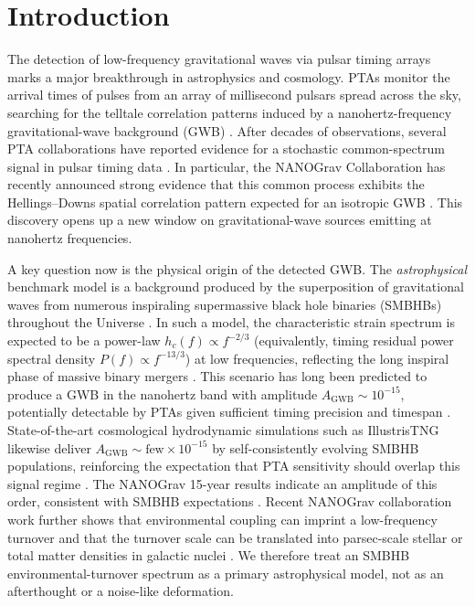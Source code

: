\documentclass[symmetry,article,submit,pdftex,moreauthors]{Definitions/mdpi}
\begin{document}
\section{Introduction}\label{sec:intro}
The detection of low-frequency gravitational waves via pulsar timing arrays marks a major breakthrough in astrophysics and cosmology. PTAs monitor the arrival times of pulses from an array of millisecond pulsars spread across the sky, searching for the telltale correlation patterns induced by a nanohertz-frequency gravitational-wave background (GWB) \cite{Hellings1983,BurkeSpolaor2019}. After decades of observations, several PTA collaborations have reported evidence for a stochastic common-spectrum signal in pulsar timing data \cite{NANOGrav12p5,Chen2021,Goncharov2021,PPTA2023,CPTA2023}. In particular, the NANOGrav Collaboration has recently announced strong evidence that this common process exhibits the Hellings--Downs spatial correlation pattern expected for an isotropic GWB \cite{NANOGrav15-Evidence}. This discovery opens up a new window on gravitational-wave sources emitting at nanohertz frequencies.

A key question now is the physical origin of the detected GWB. The \emph{astrophysical} benchmark model is a background produced by the superposition of gravitational waves from numerous inspiraling supermassive black hole binaries (SMBHBs) throughout the Universe \cite{Sesana2013,Kelley2017}. In such a model, the characteristic strain spectrum is expected to be a power-law $h_c(f) \propto f^{-2/3}$ (equivalently, timing residual power spectral density $P(f) \propto f^{-13/3}$) at low frequencies, reflecting the long inspiral phase of massive binary mergers \cite{Sesana2013}. This scenario has long been predicted to produce a GWB in the nanohertz band with amplitude $A_{\mathrm{GWB}}\sim10^{-15}$, potentially detectable by PTAs given sufficient timing precision and timespan \cite{Sesana2013}. State-of-the-art cosmological hydrodynamic simulations such as IllustrisTNG likewise deliver $A_{\mathrm{GWB}}\sim\text{few}\times10^{-15}$ by self-consistently evolving SMBHB populations, reinforcing the expectation that PTA sensitivity should overlap this signal regime \cite{Kelley2017}. The NANOGrav 15-year results indicate an amplitude of this order, consistent with SMBHB expectations \cite{NANOGrav15-Evidence}. Recent NANOGrav collaboration work further shows that environmental coupling can imprint a low-frequency turnover and that the turnover scale can be translated into parsec-scale stellar or total matter densities in galactic nuclei \cite{ChenTomography2024}. We therefore treat an SMBHB environmental-turnover spectrum as a primary astrophysical model, not as an afterthought or a noise-like deformation.
\end{document}
